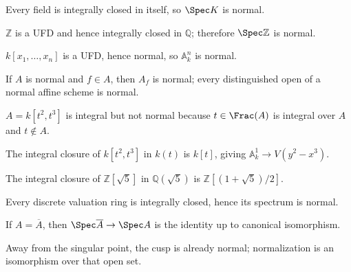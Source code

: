 \begin{example}[A field]\label{ex:vi28-01}
Every field is integrally closed in itself, so $\Spec K$ is normal.
\end{example}

\begin{example}\label{ex:vi28-02}
$\mathbb Z$ is a UFD and hence integrally closed in $\mathbb Q$; therefore $\Spec\mathbb Z$ is normal.
\end{example}

\begin{example}\label{ex:vi28-03}
$k[x_1,\dots,x_n]$ is a UFD, hence normal, so $\mathbb A^n_k$ is normal.
\end{example}

\begin{example}\label{ex:vi28-04}
If $A$ is normal and $f\in A$, then $A_f$ is normal; every distinguished open of a normal affine scheme is normal.
\end{example}

\begin{example}\label{ex:vi28-05}
$A=k[t^2,t^3]$ is integral but not normal because $t\in\Frac(A)$ is integral over $A$ and $t\notin A$.
\end{example}

\begin{example}\label{ex:vi28-06}
The integral closure of $k[t^2,t^3]$ in $k(t)$ is $k[t]$, giving $\mathbb A^1_k\to V(y^2-x^3)$.
\end{example}

\begin{example}\label{ex:vi28-07}
The integral closure of $\mathbb Z[\sqrt5]$ in $\mathbb Q(\sqrt5)$ is $\mathbb Z[(1+\sqrt5)/2]$.
\end{example}

\begin{example}[A DVR]\label{ex:vi28-08}
Every discrete valuation ring is integrally closed, hence its spectrum is normal.
\end{example}

\begin{example}\label{ex:vi28-09}
If $A=\overline A$, then $\Spec\overline A\to\Spec A$ is the identity up to canonical isomorphism.
\end{example}

\begin{example}\label{ex:vi28-10}
Away from the singular point, the cusp is already normal; normalization is an isomorphism over that open set.
\end{example}

